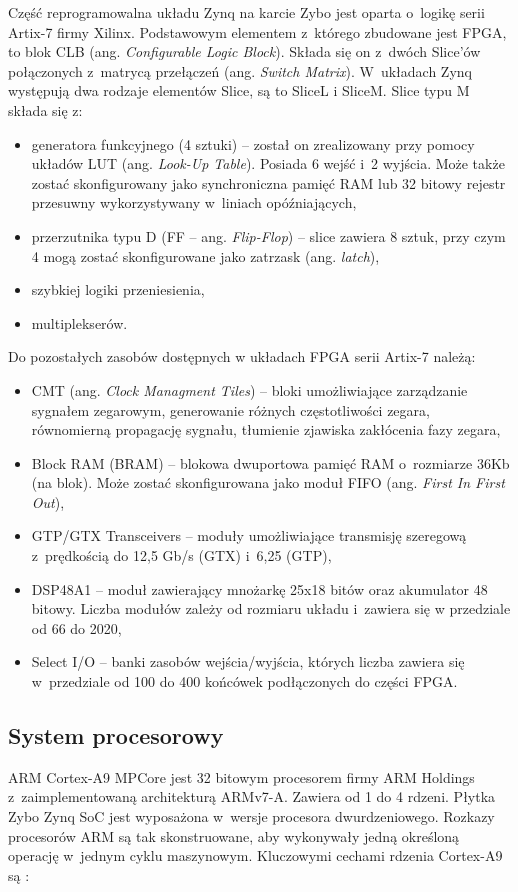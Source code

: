 Część reprogramowalna układu Zynq na karcie Zybo jest oparta o~logikę serii  Artix-7 firmy Xilinx. 
Podstawowym elementem z~którego zbudowane jest FPGA, to blok CLB (ang. \textit{Configurable Logic Block}). 
Składa się on z~dwóch Slice'ów połączonych z~matrycą przełączeń (ang. \textit{Switch Matrix}). 
W~układach Zynq występują dwa rodzaje elementów Slice, są to SliceL i SliceM. 
Slice typu M składa się z:
\begin{itemize}
	\item generatora funkcyjnego (4 sztuki) -- został on zrealizowany przy pomocy układów LUT (ang. \textit{Look-Up Table}). Posiada 6 wejść i~2 wyjścia. Może także zostać skonfigurowany jako synchroniczna pamięć RAM lub 32 bitowy rejestr przesuwny wykorzystywany w~liniach opóźniających,
	\item przerzutnika typu D (FF -- ang. \textit{Flip-Flop}) -- slice zawiera 8 sztuk, przy czym 4 mogą zostać skonfigurowane jako zatrzask (ang. \textit{latch}),
	\item szybkiej logiki przeniesienia,
	\item multiplekserów.
\end{itemize}

Do pozostałych zasobów dostępnych w układach FPGA serii Artix-7 należą:
\begin{itemize}
	\item CMT (ang. \textit{Clock Managment Tiles}) -- bloki umożliwiające zarządzanie sygnałem zegarowym, generowanie różnych częstotliwości zegara, równomierną propagację sygnału, tłumienie zjawiska zakłócenia fazy zegara,
	\item Block RAM (BRAM) -- blokowa dwuportowa pamięć RAM o~rozmiarze 36Kb (na blok). Może zostać skonfigurowana jako moduł FIFO (ang. \textit{First In First Out}), 
	\item GTP/GTX Transceivers -- moduły umożliwiające transmisję szeregową z~prędkością do 12,5 Gb/s (GTX) i~6,25 (GTP),
	\item DSP48A1 -- moduł zawierający mnożarkę 25x18 bitów oraz akumulator 48 bitowy. Liczba modułów zależy od rozmiaru układu i~zawiera się w przedziale od 66 do 2020,
	\item Select I/O -- banki zasobów wejścia/wyjścia, których liczba zawiera się w~przedziale od 100 do 400 końcówek podłączonych do części FPGA.
\end{itemize}

\subsection{System procesorowy}
ARM Cortex-A9 MPCore jest 32 bitowym procesorem firmy ARM Holdings z~zaimplementowaną architekturą ARMv7-A. 
Zawiera od 1 do 4 rdzeni. 
Płytka Zybo Zynq SoC jest wyposażona w~wersje procesora dwurdzeniowego.
Rozkazy procesorów ARM są tak skonstruowane, aby wykonywały jedną określoną operację w~jednym cyklu maszynowym.
Kluczowymi cechami rdzenia Cortex-A9 są \cite{armCortex}:

